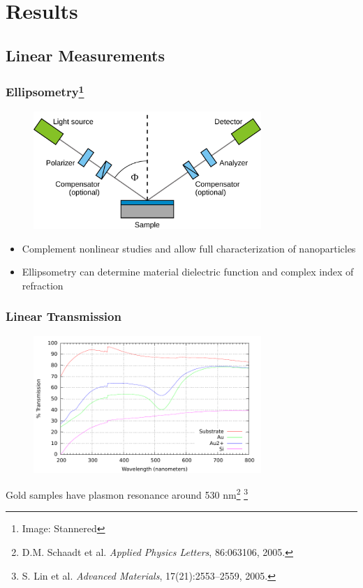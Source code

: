 \documentclass{beamer}
\begin{document}
\section{Results}
\subsection{Linear Measurements}
\begin{frame}
\frametitle{Ellipsometry\footnote{Image: Stannered}}
\begin{figure}
\centering
\includegraphics[width=0.77\textwidth]{ellipsometry}
\end{figure}
\begin{itemize}
\item Complement nonlinear studies and allow full characterization of nanoparticles
\item Ellipsometry can determine material dielectric function and complex index of refraction
\end{itemize}
\end{frame}

\begin{frame}
\frametitle{Linear Transmission}
\begin{figure}
\centering
\includegraphics[width=0.77\textwidth]{linear_transmission}
\end{figure}
Gold samples have plasmon resonance around 530 nm\footnote{D.M. Schaadt et al. \emph{Applied Physics Letters}, 86:063106, 2005.} \footnote{S. Lin et al. \emph{Advanced Materials}, 17(21):2553--2559, 2005.}
\end{frame}
\end{document}
